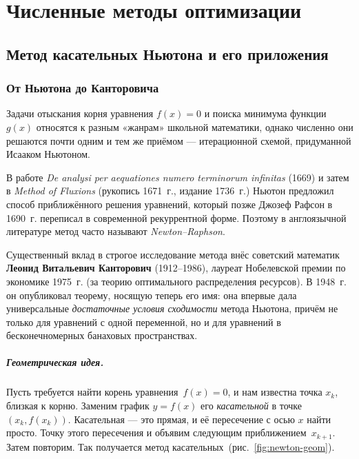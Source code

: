 \chapter{Численные методы оптимизации}
\label{ch:opt}

\section{Метод касательных Ньютона и его приложения}
\label{sec:newton}

\subsection{От Ньютона до Канторовича}

Задачи отыскания корня уравнения $f(x)=0$ и поиска минимума функции
$g(x)$ относятся к разным «жанрам» школьной математики, однако
численно они решаются почти одним и тем же приёмом — итерационной
схемой, придуманной Исааком Ньютоном.

\begin{historybox}
В работе \emph{De analysi per aequationes numero terminorum infinitas}
(1669) и затем в \emph{Method of Fluxions} (рукопись 1671~г., издание
1736~г.) Ньютон предложил способ приближённого решения уравнений,
который позже Джозеф Рафсон в 1690~г. переписал в современной
рекуррентной форме. Поэтому в англоязычной литературе метод часто
называют \emph{Newton–Raphson}.

Существенный вклад в строгое исследование метода внёс советский
математик \textbf{Леонид Витальевич Канторович} (1912–1986),
лауреат Нобелевской премии по экономике 1975~г. (за теорию
оптимального распределения ресурсов). В 1948~г. он опубликовал
теорему, носящую теперь его имя: она впервые дала универсальные
\emph{достаточные условия сходимости} метода Ньютона, причём не
только для уравнений с одной переменной, но и для уравнений в
бесконечномерных банаховых пространствах.
\end{historybox}

\paragraph{Геометрическая идея.} Пусть требуется найти корень
уравнения~$f(x)=0$, и нам известна точка $x_k$, близкая к корню.
Заменим график $y=f(x)$ его \emph{касательной} в точке $(x_k, f(x_k))$.
Касательная — это прямая, и её пересечение с осью $x$ найти просто.
Точку этого пересечения и объявим следующим приближением~$x_{k+1}$.
Затем повторим. Так получается метод касательных~(рис.~\ref{fig:newton-geom}).

